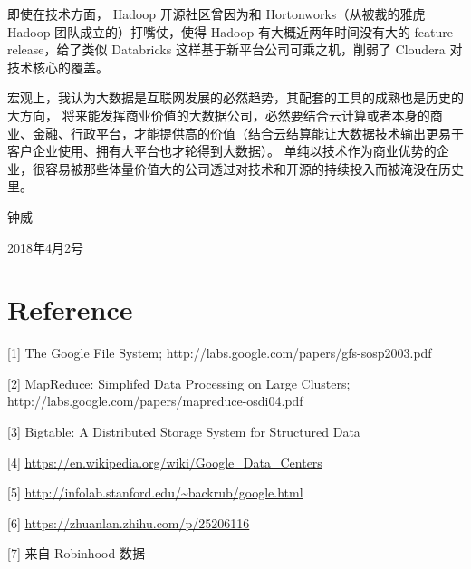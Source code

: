 \documentclass[11pt, twoside, a4paper]{article}
\begin{document}
即使在技术方面， Hadoop 开源社区曾因为和 Hortonworks（从被裁的雅虎 Hadoop 团队成立的）打嘴仗，使得 Hadoop 
有大概近两年时间没有大的 feature release，给了类似 Databricks 这样基于新平台公司可乘之机，削弱了 Cloudera 对技术核心的覆盖。

宏观上，我认为大数据是互联网发展的必然趋势，其配套的工具的成熟也是历史的大方向，
将来能发挥商业价值的大数据公司，必然要结合云计算或者本身的商业、金融、行政平台，才能提供高的价值（结合云结算能让大数据技术输出更易于客户企业使用、拥有大平台也才轮得到大数据）。
单纯以技术作为商业优势的企业，很容易被那些体量价值大的公司透过对技术和开源的持续投入而被淹没在历史里。


\vspace{1cm}
钟威

2018年4月2号

\section{Reference}
{\setlength{\parindent}{0cm}
[1] The Google File System; http://labs.google.com/papers/gfs-sosp2003.pdf

[2] MapReduce: Simplifed Data Processing on Large Clusters;  http://labs.google.com/papers/mapreduce-osdi04.pdf

[3] Bigtable: A Distributed Storage System for Structured Data

[4] \url{https://en.wikipedia.org/wiki/Google_Data_Centers}

[5] \url{http://infolab.stanford.edu/~backrub/google.html}

[6] \url{https://zhuanlan.zhihu.com/p/25206116}

[7] 来自 Robinhood 数据

} 
\end{document}
